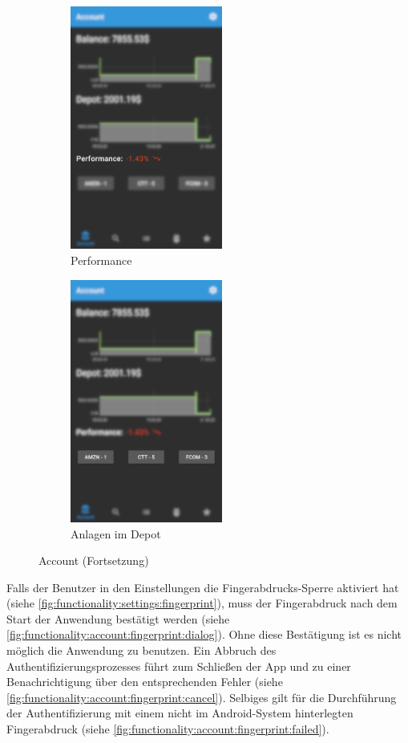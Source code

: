 \documentclass[a4paper]{article}
\begin{document}
\begin{figure}[H]
    \ContinuedFloat
    \begin{subfigure}{.5\textwidth}
        \centering
        \includegraphics[height=8cm,keepaspectratio]{./images/account/performance.png}
        \caption{Performance}
        \label{fig:functionality:account:performance}
    \end{subfigure}
    \begin{subfigure}{.5\textwidth}
        \centering
        \includegraphics[height=8cm,keepaspectratio]{./images/account/depot_quotes.png}
        \caption{Anlagen im Depot}
        \label{fig:functionality:account:depot_quotes}
    \end{subfigure}
    \caption{Account (Fortsetzung)}
\end{figure}

Falls der Benutzer in den Einstellungen die Fingerabdrucks-Sperre aktiviert hat (siehe \autoref{fig:functionality:settings:fingerprint}), muss der Fingerabdruck nach dem Start der Anwendung bestätigt werden (siehe \autoref{fig:functionality:account:fingerprint:dialog}). Ohne diese Bestätigung ist es nicht möglich die Anwendung zu benutzen. Ein Abbruch des Authentifizierungsprozesses führt zum Schließen der App und zu einer Benachrichtigung über den entsprechenden Fehler (siehe \autoref{fig:functionality:account:fingerprint:cancel}). Selbiges gilt für die Durchführung der Authentifizierung mit einem nicht im Android-System hinterlegten Fingerabdruck (siehe \autoref{fig:functionality:account:fingerprint:failed}).
\end{document}
